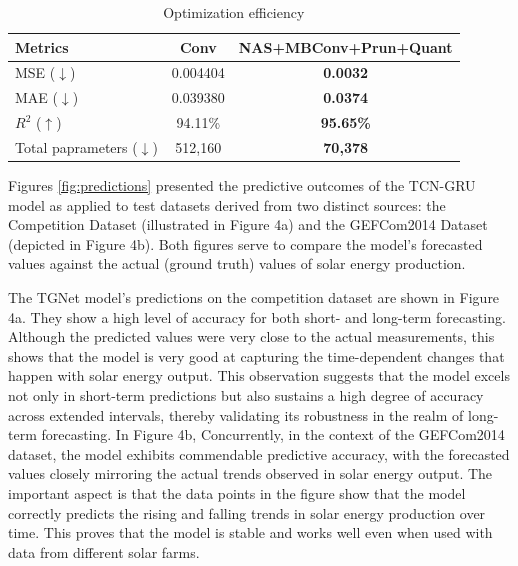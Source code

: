 \documentclass[sn-mathphys-num]{sn-jnl}%
\begin{document}
\begin{table}[hb!]
    \centering
    \caption{Optimization efficiency}
    \begin{tabular}{l|c|c}
        \toprule
        \textbf{Metrics} & \textbf{Conv} & \textbf{NAS+MBConv+Prun+Quant} \\
        \midrule
        MSE ($\downarrow$) & 0.004404 & \textbf{0.0032} \\
        MAE ($\downarrow$) & 0.039380 & \textbf{0.0374} \\
        $R^2$ ($\uparrow$) & 94.11\% & \textbf{95.65\%} \\
        Total paprameters ($\downarrow$) & 512,160 & \textbf{70,378} \\
        \bottomrule
    \end{tabular}
    \label{t6}
\end{table}

Figures \ref{fig:predictions} presented the predictive outcomes of the TCN-GRU model as applied to test datasets derived from two distinct sources: the Competition Dataset (illustrated in Figure 4a) and the GEFCom2014 Dataset (depicted in Figure 4b). Both figures serve to compare the model's forecasted values against the actual (ground truth) values of solar energy production.

The TGNet model's predictions on the competition dataset are shown in Figure 4a. They show a high level of accuracy for both short- and long-term forecasting. Although the predicted values were very close to the actual measurements, this shows that the model is very good at capturing the time-dependent changes that happen with solar energy output. This observation suggests that the model excels not only in short-term predictions but also sustains a high degree of accuracy across extended intervals, thereby validating its robustness in the realm of long-term forecasting.
In Figure 4b, Concurrently, in the context of the GEFCom2014 dataset, the model exhibits commendable predictive accuracy, with the forecasted values closely mirroring the actual trends observed in solar energy output. The important aspect is that the data points in the figure show that the model correctly predicts the rising and falling trends in solar energy production over time. This proves that the model is stable and works well even when used with data from different solar farms.

\end{document}
